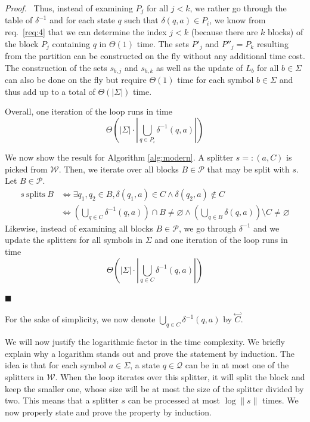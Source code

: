 \documentclass[12pt, a4 paper]{article}
\renewenvironment{proof}[1][Proof]{\begin{mdframed}[backgroundcolor=black!5, topline=false, rightline=false, bottomline=false, linecolor=black!15, linewidth=3pt]{\noindent\textit{#1.}\ }}{\noindent\par\hfill$\blacksquare$\end{mdframed}}
\theoremstyle{definition}
\begin{document}
\begin{proof}
    Thus, instead of examining $P_j$ for all $j < k$, we rather go through the table of $\delta^{-1}$ and for each state $q$ such that $\delta(q, a) \in P_i$, we know from req.\ \ref{req:4} that we can determine the index $j < k$ (because there are $k$ blocks) of the block $P_j$ containing $q$ in $\Theta(1)$ time. The sets $P'_j$ and $P''_j = P_k$ resulting from the partition can be constructed on the fly without any additional time cost. The construction of the sets $s_{b, j}$ and $s_{b, k}$ as well as the update of $L_b$ for all $b \in \Sigma$ can also be done on the fly but require $\Theta(1)$ time for each symbol $b \in \Sigma$ and thus add up to a total of $\Theta(\left| \Sigma \right|)$ time.

    Overall, one iteration of the loop runs in time
    $$\Theta \left( \left| \Sigma \right| \cdot \left| \bigcup_{q \in P_i} \delta^{-1}(q, a) \right| \right) $$

    \bigskip
    We now show the result for Algorithm \ref{alg:modern}. A splitter ${s =: (a, C)}$ is picked from $\mathcal{W}$. Then, we iterate over all blocks $B \in \mathcal{P}$ that may be split with $s$. Let $B \in \mathcal{P}$.
    \begin{align*}
        s\ \text{splits}\ B &\iff \exists q_1, q_2 \in B, \delta(q_1, a) \in C \land \delta(q_2, a) \notin C\\
        &\iff \left(\bigcup_{q \in C} \delta^{-1}(q, a)\right)\cap B \neq \varnothing \land \left(\bigcup_{q \in B}\delta(q, a)\right)\setminus C \neq \varnothing
    \end{align*}
    Likewise, instead of examining all blocks $B \in \mathcal{P}$, we go through $\delta^{-1}$ and we update the splitters for all symbols in $\Sigma$ and one iteration of the loop runs in time
    $$\Theta \left( \left| \Sigma \right| \cdot \left| \bigcup_{q \in C} \delta^{-1}(q, a) \right| \right) $$
\end{proof}

For the sake of simplicity, we now denote $\displaystyle{\bigcup_{q \in C} \delta^{-1}(q, a)}$ by $\overset{\hookleftarrow}{C}$.

We will now justify the logarithmic factor in the time complexity. We briefly explain why a logarithm stands out and prove the statement by induction. The idea is that for each symbol $a \in \Sigma$, a state $q \in \mathcal{Q}$ can be in at most one of the splitters in $\mathcal{W}$. When the loop iterates over this splitter, it will split the block and keep the smaller one, whose size will be at most the size of the splitter divided by two. This means that a splitter $s$ can be processed at most $\log \| s \|$ times. We now properly state and prove the property by induction.
\end{document}

